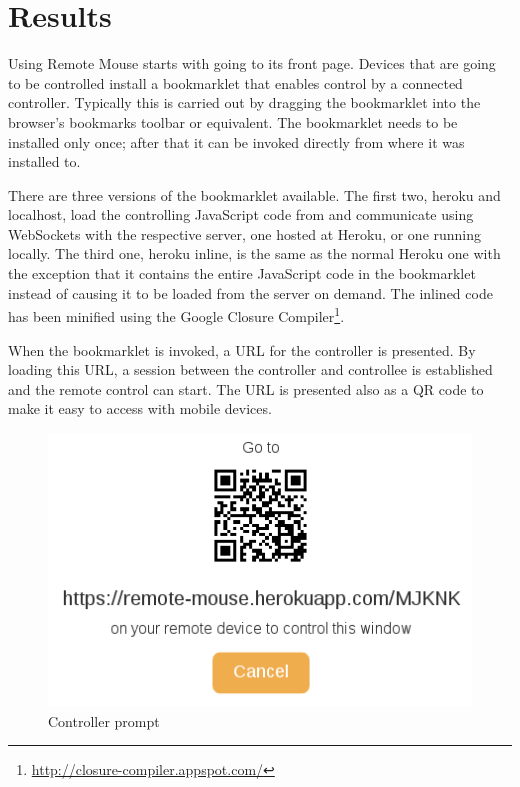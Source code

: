 \documentclass[a4paper,english,twocolumn,9pt]{extarticle}
\begin{document}
\section{Results}

Using Remote Mouse starts with going to its front page. Devices that
are going to be controlled install a bookmarklet that enables control
by a connected controller. Typically this is carried out by dragging
the bookmarklet into the browser's bookmarks toolbar or
equivalent. The bookmarklet needs to be installed only once; after
that it can be invoked directly from where it was installed to.

There are three versions of the bookmarklet available. The first two,
heroku and localhost, load the controlling JavaScript code from and
communicate using WebSockets with the respective server, one hosted at
Heroku, or one running locally. The third one, heroku inline, is the
same as the normal Heroku one with the exception that it contains the
entire JavaScript code in the bookmarklet instead of causing it to be
loaded from the server on demand. The inlined code has been minified
using the Google Closure
Compiler\footnote{\url{http://closure-compiler.appspot.com/}}.

When the bookmarklet is invoked, a URL for the controller is
presented. By loading this URL, a session between the controller and
controllee is established and the remote control can start. The URL is
presented also as a QR code to make it easy to access with mobile
devices.

\begin{figure}[htb]
  \begin{center}
    \includegraphics[scale=0.3]{prompt}
    \caption{Controller prompt}
  \end{center}
\end{figure}
\end{document}
